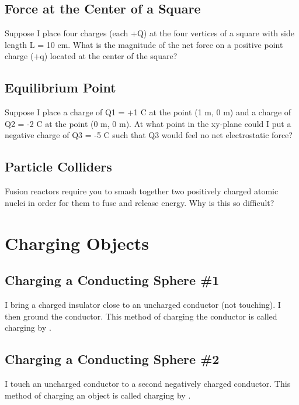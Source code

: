 \documentclass[11pt]{article}
\begin{document}
\subsection{Force at the Center of a Square}
Suppose I place four charges (each +Q) at the four vertices of a square with side length L = 10 cm.  What is the magnitude of the net force on a positive point charge (+q) located at the center of the square?

\subsection{Equilibrium Point}
Suppose I place a charge of Q1 = +1 C at the point (1 m, 0 m) and a charge of Q2 = -2 C at the point (0 m, 0 m).  At what point in the xy-plane could I put a negative charge of Q3 = -5 C such that Q3 would feel no net electrostatic force?

\subsection{Particle Colliders}
Fusion reactors require you to smash together two positively charged atomic nuclei in order for them to fuse and release energy.  Why is this so difficult?


\pagebreak
\section{Charging Objects}

\subsection{Charging a Conducting Sphere \#1}
I bring a charged insulator close to an uncharged conductor (not touching).  I then ground the conductor.  This method of charging the conductor is called charging by \underline{\hspace{1cm}}.

\subsection{Charging a Conducting Sphere \#2}
I touch an uncharged conductor to a second negatively charged conductor.  This method of charging an object is called charging by \underline{\hspace{1cm}}.
\end{document}
